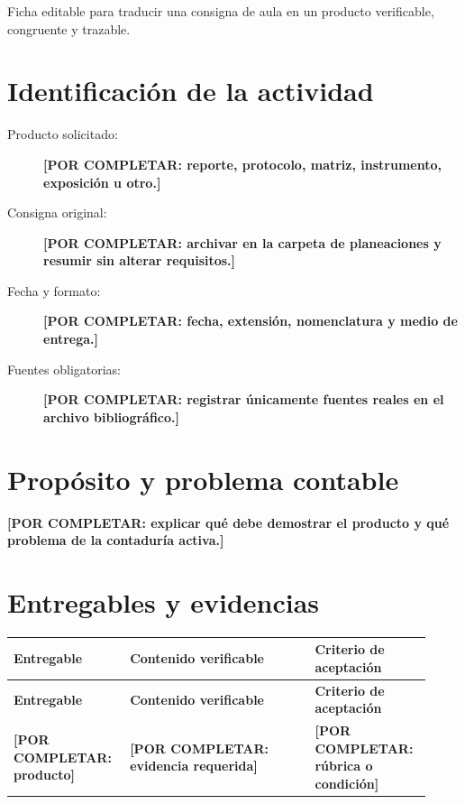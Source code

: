 \documentclass[spanish,letterpaper,oneside]{article}
\newcommand{\porcompletar}[1]{\textcolor{uasBlue}{\textbf{[POR COMPLETAR: #1]}}}
\begin{document}
\templatePortrait
\templatePagecfg
\onehalfspacing
\begin{abstractd}
  Ficha editable para traducir una consigna de aula en un producto verificable, congruente y trazable.
\end{abstractd}
\templateIndex
\templateFinalcfg

\section{Identificación de la actividad}
\begin{description}
  \item[Producto solicitado:] \porcompletar{reporte, protocolo, matriz, instrumento, exposición u otro.}
  \item[Consigna original:] \porcompletar{archivar en la carpeta de planeaciones y resumir sin alterar requisitos.}
  \item[Fecha y formato:] \porcompletar{fecha, extensión, nomenclatura y medio de entrega.}
  \item[Fuentes obligatorias:] \porcompletar{registrar únicamente fuentes reales en el archivo bibliográfico.}
\end{description}

\section{Propósito y problema contable}
\porcompletar{explicar qué debe demostrar el producto y qué problema de la contaduría activa.}

\section{Entregables y evidencias}
\begin{longtable}{@{}p{0.25\linewidth}p{0.42\linewidth}p{0.25\linewidth}@{}}
\toprule
\textbf{Entregable} & \textbf{Contenido verificable} & \textbf{Criterio de aceptación} \\
\midrule
\endfirsthead
\toprule
\textbf{Entregable} & \textbf{Contenido verificable} & \textbf{Criterio de aceptación} \\
\midrule
\endhead
\bottomrule
\endlastfoot
\porcompletar{producto} & \porcompletar{evidencia requerida} & \porcompletar{rúbrica o condición} \\
\end{longtable}
\end{document}
